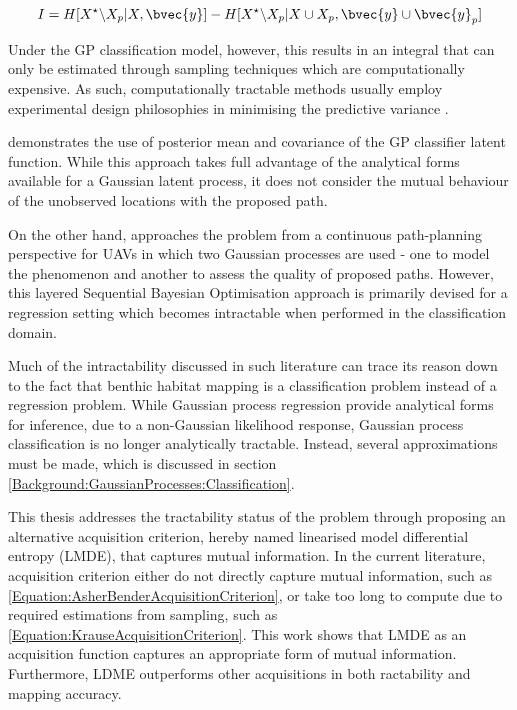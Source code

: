 			\begin{equation}
				I = H[X^{\star} \backslash X_{p} | X, \bvec{y}] - H[X^{\star} \backslash X_{p} | X \cup X_{p}, \bvec{y} \cup \bvec{y}_{p}]
			\label{Equation:KrauseAcquisitionCriterion}
			\end{equation}
			
			Under the GP classification model, however, this results in an integral that can only be estimated through sampling techniques which are computationally expensive. As such, computationally tractable methods usually employ experimental design philosophies in minimising the predictive variance \citep{AsherBender}.
			
			\cite{Kapoor} demonstrates the use of posterior mean and covariance of the GP classifier latent function. While this approach takes full advantage of the analytical forms available for a Gaussian latent process, it does not consider the mutual behaviour of the unobserved locations with the proposed path.
			
			On the other hand, \cite{Roman:SequentialBayesianOptimisation} approaches the problem from a continuous path-planning perspective for UAVs in which two Gaussian processes are used - one to model the phenomenon and another to assess the quality of proposed paths. However, this layered Sequential Bayesian Optimisation approach is primarily devised for a regression setting which becomes intractable when performed in the classification domain.
			
			Much of the intractability discussed in such literature can trace its reason down to the fact that benthic habitat mapping is a classification problem instead of a regression problem. While Gaussian process regression provide analytical forms for inference, due to a non-Gaussian likelihood response, Gaussian process classification is no longer analytically tractable. Instead, several approximations must be made, which is discussed in section \ref{Background:GaussianProcesses:Classification}.
			
			This thesis addresses the tractability status of the problem through proposing an alternative acquisition criterion, hereby named linearised model differential entropy (LMDE), that captures mutual information. In the current literature, acquisition criterion either do not directly capture mutual information, such as \eqref{Equation:AsherBenderAcquisitionCriterion}, or take too long to compute due to required estimations from sampling, such as \eqref{Equation:KrauseAcquisitionCriterion}. This work shows that LMDE as an acquisition function captures an appropriate form of mutual information. Furthermore, LDME outperforms other acquisitions in both ractability and mapping accuracy.		